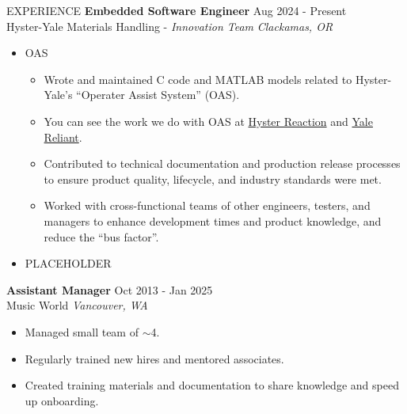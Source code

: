 \documentclass{resume} %
\begin{document}
	\begin{rSection}{EXPERIENCE}
		\textbf{Embedded Software Engineer} \hfill Aug 2024 - Present \\
		Hyster-Yale Materials Handling - \textit{Innovation Team} \hfill \textit{Clackamas, OR}
		\begin{itemize} \itemsep -5pt {}
			\item OAS
			\begin{itemize} \itemsep -5pt {}
				\item Wrote and maintained C code and MATLAB models related to Hyster-Yale's ``Operater Assist System'' (OAS). 
				\item You can see the work we do with OAS at \href{https://www.hyster.com/en-us/north-america/technology/telematics/hyster-reaction/}{Hyster Reaction} and \href{https://www.yale.com/en-us/north-america/technology/yale-reliant/}{Yale Reliant}.
				
				\item Contributed to technical documentation and production release processes to ensure product quality, lifecycle, and industry standards were met.
				\item Worked with cross-functional teams of other engineers, testers, and managers to enhance development times and product knowledge, and reduce the ``bus factor''.
			\end{itemize}
			
			\item PLACEHOLDER
			
		\end{itemize}
	
		\textbf{Assistant Manager} \hfill Oct 2013 - Jan 2025 \\
		Music World \hfill \textit{Vancouver, WA}
		\begin{itemize} \itemsep -5pt {} 
			\item Managed small team of $\sim$4.
			\item Regularly trained new hires and mentored associates. 
			\item Created training materials and documentation to share knowledge and speed up onboarding.
		\end{itemize}
	\end{rSection} 

	
\end{document}

